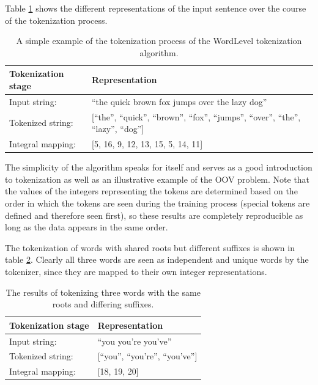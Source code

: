 \documentclass[12pt]{article}
\begin{document}
Table \ref{tab:wordlevel_tokenization_example} shows the different representations of the input sentence over the course of the tokenization process.

\begin{table}[!t]
    \centering
    \begin{tabular}{l l}
        \toprule
        Tokenization stage & Representation                                                                            \\
        \midrule
        Input string:      & ``the quick brown fox jumps over the lazy dog''                                           \\
        Tokenized string:  & [``the'', ``quick'', ``brown'', ``fox'', ``jumps'', ``over'', ``the'', ``lazy'', ``dog''] \\
        Integral mapping:  & [5, 16, 9, 12, 13, 15, 5, 14, 11]                                                         \\
        \bottomrule
    \end{tabular}
    \caption{A simple example of the tokenization process of the WordLevel tokenization algorithm.}
    \label{tab:wordlevel_tokenization_example}
\end{table}

The simplicity of the algorithm speaks for itself and serves as a good introduction to tokenization as well as an illustrative example of the OOV
problem. Note that the values of the integers representing the tokens are determined based on the order in which the tokens are seen during the
training process (special tokens are defined and therefore seen first), so these results are completely reproducible as long as the data appears in
the same order.

The tokenization of words with shared roots but different suffixes is shown in table \ref{tab:wordlevel_tokenization_shared_roots_example}. Clearly
all three words are seen as independent and unique words by the tokenizer, since they are mapped to their own integer representations.

\begin{table}[!t]
    \centering
    \begin{tabular}{l l}
        \toprule
        Tokenization stage & Representation                    \\
        \midrule
        Input string:      & ``you you're you've''             \\
        Tokenized string:  & [``you'', ``you're'', ``you've''] \\
        Integral mapping:  & [18, 19, 20]                      \\
        \bottomrule
    \end{tabular}
    \caption{The results of tokenizing three words with the same roots and differing suffixes.}
    \label{tab:wordlevel_tokenization_shared_roots_example}
\end{table}
\end{document}
